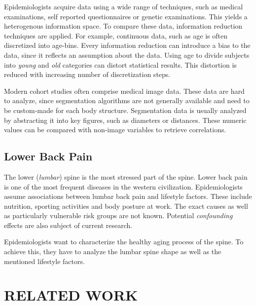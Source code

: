 \documentclass[a4paper,twoside]{style/article}
\begin{document}
Epidemiologists acquire data using a wide range of techniques, such as medical examinations, self reported questionnaires or genetic examinations.
This yields a heterogenous information space.
To compare these data, information reduction techniques are applied.
For example, continuous data, such as age is often discretized into age-bins.
Every information reduction can introduce a bias to the data, since it reflects an assumption about the data.
Using age to divide subjects into \emph{young} and \emph{old} categories can distort statistical results.
This distortion is reduced with increasing number of discretization steps.

Modern cohort studies often comprise medical image data.
These data are hard to analyze, since segmentation algorithms are not generally available and need to be custom-made for each body structure.
Segmentation data is usually analyzed by abstracting it into key figures, such as diameters or distances.
These numeric values can be compared with non-image variables to retrieve correlations.
\subsection{Lower Back Pain}
The lower (\emph{lumbar}) spine is the most stressed part of the spine.
Lower back pain is one of the most frequent diseases in the western civilization.
Epidemiologists assume associations between lumbar back pain and lifestyle factors.
These include nutrition, sporting activities and body posture at work.
The exact causes as well as particularly vulnerable risk groups are not known.
Potential \emph{confounding} effects are also subject of current research.

Epidemiologists want to characterize the healthy aging process of the spine.
To achieve this, they have to analyze the lumbar spine shape as well as the mentioned lifestyle factors.
\section{\uppercase{Related Work}}
\label{sec:RelatedWork}
\end{document}
